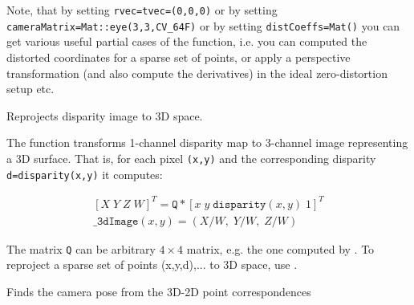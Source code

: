 Note, that by setting \texttt{rvec=tvec=(0,0,0)} or by setting \texttt{cameraMatrix=Mat::eye(3,3,CV\_64F)} or by setting \texttt{distCoeffs=Mat()} you can get various useful partial cases of the function, i.e. you can computed the distorted coordinates for a sparse set of points, or apply a perspective transformation (and also compute the derivatives) in the ideal zero-distortion setup etc.

Reprojects disparity image to 3D space.

\begin{description}
\end{description}
 
The function transforms 1-channel disparity map to 3-channel image representing a 3D surface. That is, for each pixel \texttt{(x,y)} and the corresponding disparity \texttt{d=disparity(x,y)} it computes: 

\[\begin{array}{l}
[X\; Y\; Z\; W]^T = \texttt{Q}*[x\; y\; \texttt{disparity}(x,y)\; 1]^T \\
\texttt{\_3dImage}(x,y) = (X/W,\; Y/W,\; Z/W)
\end{array}\]

The matrix \texttt{Q} can be arbitrary $4 \times 4$ matrix, e.g. the one computed by . To reproject a sparse set of points {(x,y,d),...} to 3D space, use .  


Finds the camera pose from the 3D-2D point correspondences

